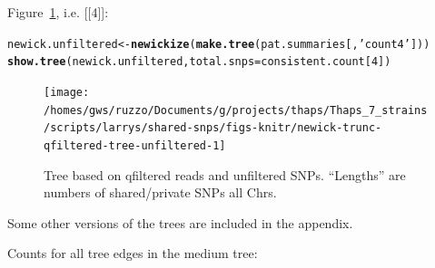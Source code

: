 \documentclass{article}\usepackage[]{graphicx}\usepackage[]{color}
\makeatletter
\newcommand{\hlnum}[1]{\textcolor[rgb]{0.686,0.059,0.569}{#1}}%
\newcommand{\hlstr}[1]{\textcolor[rgb]{0.192,0.494,0.8}{#1}}%
\newcommand{\hlstd}[1]{\textcolor[rgb]{0.345,0.345,0.345}{#1}}%
\newcommand{\hlkwb}[1]{\textcolor[rgb]{0.69,0.353,0.396}{#1}}%
\newcommand{\hlkwc}[1]{\textcolor[rgb]{0.333,0.667,0.333}{#1}}%
\newcommand{\hlkwd}[1]{\textcolor[rgb]{0.737,0.353,0.396}{\textbf{#1}}}%
\newenvironment{kframe}{%
 \def\at@end@of@kframe{}%
 \ifinner\ifhmode%
  \def\at@end@of@kframe{\end{minipage}}%
  \begin{minipage}{\columnwidth}%
 \fi\fi%
 \def\FrameCommand##1{\hskip\@totalleftmargin \hskip-\fboxsep
 \colorbox{shadecolor}{##1}\hskip-\fboxsep
     \hskip-\linewidth \hskip-\@totalleftmargin \hskip\columnwidth}%
 \MakeFramed {\advance\hsize-\width
   \@totalleftmargin\z@ \linewidth\hsize
   \@setminipage}}%
 {\par\unskip\endMakeFramed%
 \at@end@of@kframe}
\newenvironment{knitrout}{}{} %
\makeatother
\begin{document}
Figure~\ref{fig:tree-unfiltered}, i.e. [[4]]:

\begin{knitrout}\scriptsize
{}\color{fgcolor}\begin{kframe}
\begin{alltt}
\hlstd{newick.unfiltered} \hlkwb{<-} \hlkwd{newickize}\hlstd{(}\hlkwd{make.tree}\hlstd{(pat.summaries[,}\hlstr{'count4'}\hlstd{]))}
\hlkwd{show.tree}\hlstd{(newick.unfiltered,} \hlkwc{total.snps}\hlstd{=consistent.count[}\hlnum{4}\hlstd{])}
\end{alltt}
\end{kframe}\begin{figure}

{\centering \texttt{[image: /homes/gws/ruzzo/Documents/g/projects/thaps/Thaps\_7\_strains/scripts/larrys/shared-snps/figs-knitr/newick-trunc-qfiltered-tree-unfiltered-1]} 

}

\caption[Tree based on qfiltered reads and unfiltered SNPs]{Tree based on qfiltered reads and unfiltered SNPs.  ``Lengths'' are numbers of shared/private SNPs all Chrs.}\label{fig:tree-unfiltered}
\end{figure}


\end{knitrout}

Some other versions of the trees are included in the appendix.

Counts for all tree edges in the medium tree: 
\end{document}
